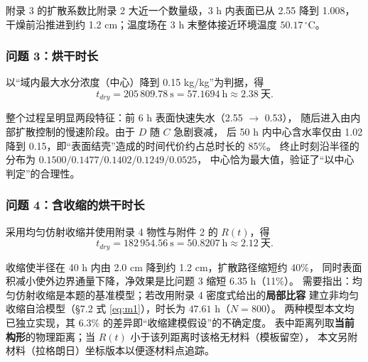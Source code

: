 \documentclass[12pt,a4paper]{ctexart}
\begin{document}
\begin{table}[htbp]
\centering
\caption*{表 4 小时内药材的水分浓度（单位：kg/kg）}
\label{tab:4}
\small
\end{table}

\noindent 附录 3 的扩散系数比附录 2 大近一个数量级，3 h 内表面已从 2.55 降到 1.008，
干燥前沿推进到约 1.2 cm；温度场在 3 h 末整体接近环境温度 $50.17\,^\circ$C。

\subsubsection{问题 3：烘干时长}
以“域内最大水分浓度（中心）降到 0.15 kg/kg”为判据，得
\begin{equation}
t_{dry}=205\,809.78\ \text{s}=57.1694\ \text{h}\approx2.38\ \text{天}.
\label{eq:q3}
\end{equation}

\begin{table}[htbp]
\centering
\caption*{表 5\quad 药材烘干过程的水分浓度（单位：kg/kg）}
\small
\end{table}

\noindent 整个过程呈明显两段特征：前 6 h 表面快速失水（2.55 $\to$ 0.53），
随后进入由内部扩散控制的慢速阶段。由于 $D$ 随 $C$ 急剧衰减，
后 50 h 内中心含水率仅由 1.02 降到 0.15，即“表面结壳”造成的时间代价约占总时长的 85\%。
终止时刻沿半径的分布为 $0.1500/0.1477/0.1402/0.1249/0.0525$，
中心恰为最大值，验证了“以中心判定”的合理性。

\subsubsection{问题 4：含收缩的烘干时长}
采用均匀仿射收缩并使用附录 4 物性与附件 2 的 $R(t)$，得
\begin{equation}
t_{dry}=182\,954.56\ \text{s}=50.8207\ \text{h}\approx2.12\ \text{天}.
\label{eq:q4}
\end{equation}

\begin{table}[htbp]
\centering
\caption*{表 6\quad 药材烘干过程的水分浓度（单位：kg/kg）}
\small
\end{table}

\noindent 收缩使半径在 40 h 内由 2.0 cm 降到约 1.2 cm，扩散路径缩短约 40\%，
同时表面积减小使外边界通量下降，净效果是比问题 3 缩短 6.35 h（11\%）。
需要指出：均匀仿射收缩是本题的基准模型；若改用附录 4 密度式给出的\textbf{局部比容}
建立非均匀收缩自洽模型（\S7.2 式 \eqref{eq:m1}），时长为 $47.61$ h（$N=800$）。
两种模型本文均已独立实现，其 $6.3\%$ 的差异即“收缩建模假设”的不确定度。
表中距离列取\textbf{当前构形}的物理距离；当 $R(t)$ 小于该列距离时该格无材料（模板留空），
本文另附材料（拉格朗日）坐标版本以便逐材料点追踪。
\end{document}
